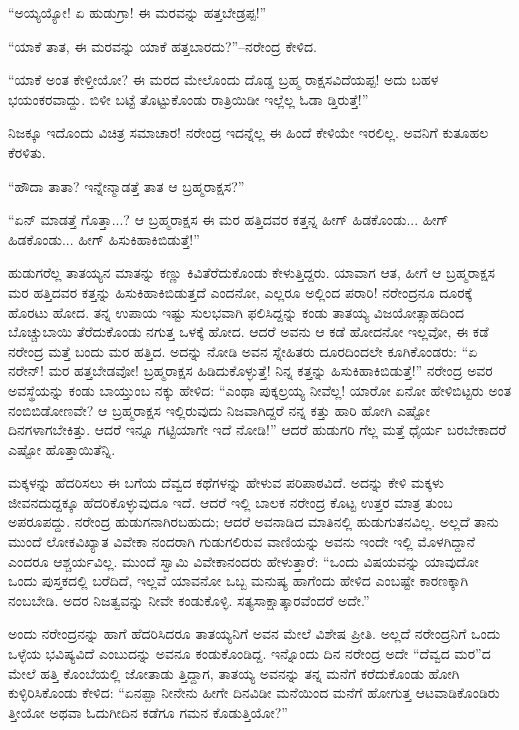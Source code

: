 “ಅಯ್ಯಯ್ಯೋ! ಏ ಹುಡುಗ್ರಾ! ಈ ಮರವನ್ನು ಹತ್ತಬೇಡ್ರಪ್ಪ!”

“ಯಾಕೆ ತಾತ, ಈ ಮರವನ್ನು ಯಾಕೆ ಹತ್ತಬಾರದು?”–ನರೇಂದ್ರ ಕೇಳಿದ.

“ಯಾಕೆ ಅಂತ ಕೇಳ್ತೀಯೋ? ಈ ಮರದ ಮೇಲೊಂದು ದೊಡ್ಡ ಬ್ರಹ್ಮ ರಾಕ್ಷಸವಿದೆಯಪ್ಪ! ಅದು ಬಹಳ ಭಯಂಕರವಾದ್ದು. ಬಿಳೀ ಬಟ್ಟೆ ತೊಟ್ಟುಕೊಂಡು ರಾತ್ರಿಯಿಡೀ ಇಲ್ಲೆಲ್ಲ ಓಡಾ ಡ್ತಿರುತ್ತೆ!”

ನಿಜಕ್ಕೂ ಇದೊಂದು ವಿಚಿತ್ರ ಸಮಾಚಾರ! ನರೇಂದ್ರ ಇದನ್ನೆಲ್ಲ ಈ ಹಿಂದೆ ಕೇಳಿಯೇ ಇರಲಿಲ್ಲ. ಅವನಿಗೆ ಕುತೂಹಲ ಕೆರಳಿತು. 

“ಹೌದಾ ತಾತಾ? ಇನ್ನೇನ್ಮಾಡತ್ತೆ ತಾತ ಆ ಬ್ರಹ್ಮರಾಕ್ಷಸ?”

“ಏನ್ ಮಾಡತ್ತೆ ಗೊತ್ತಾ...? ಆ ಬ್ರಹ್ಮರಾಕ್ಷಸ ಈ ಮರ ಹತ್ತಿದವರ ಕತ್ತನ್ನ ಹೀಗ್ ಹಿಡಕೊಂಡು... ಹೀಗ್ ಹಿಡಕೊಂಡು... ಹೀಗ್ ಹಿಸುಕಿಹಾಕಿಬಿಡುತ್ತೆ!”

ಹುಡುಗರೆಲ್ಲ ತಾತಯ್ಯನ ಮಾತನ್ನು ಕಣ್ಣು ಕಿವಿತೆರೆದುಕೊಂಡು ಕೇಳುತ್ತಿದ್ದರು. ಯಾವಾಗ ಆತ, ಹೀಗೆ ಆ ಬ್ರಹ್ಮರಾಕ್ಷಸ ಮರ ಹತ್ತಿದವರ ಕತ್ತನ್ನು ಹಿಸುಕಿಹಾಕಿಬಿಡುತ್ತದೆ ಎಂದನೋ, ಎಲ್ಲರೂ ಅಲ್ಲಿಂದ ಪರಾರಿ! ನರೇಂದ್ರನೂ ದೂರಕ್ಕೆ ಹೊರಟು ಹೋದ. ತನ್ನ ಉಪಾಯ ಇಷ್ಟು ಸುಲಭವಾಗಿ ಫಲಿಸಿದ್ದನ್ನು ಕಂಡು ತಾತಯ್ಯ ವಿಜಯೋತ್ಸಾಹದಿಂದ ಬೊಚ್ಚುಬಾಯಿ ತೆರೆದುಕೊಂಡು ನಗುತ್ತ ಒಳಕ್ಕೆ ಹೋದ. ಆದರೆ ಅವನು ಆ ಕಡೆ ಹೋದನೋ ಇಲ್ಲವೋ, ಈ ಕಡೆ ನರೇಂದ್ರ ಮತ್ತೆ ಬಂದು ಮರ ಹತ್ತಿದ. ಅದನ್ನು ನೋಡಿ ಅವನ ಸ್ನೇಹಿತರು ದೂರದಿಂದಲೇ ಕೂಗಿಕೊಂಡರು: “ಏ ನರೇನ್! ಮರ ಹತ್ತಬೇಡವೋ! ಬ್ರಹ್ಮರಾಕ್ಷಸ ಹಿಡಿದುಕೊಳ್ಳುತ್ತೆ! ನಿನ್ನ ಕತ್ತನ್ನು ಹಿಸುಕಿಹಾಕಿಬಿಡುತ್ತೆ!” ನರೇಂದ್ರ ಅವರ ಅವಸ್ಥೆಯನ್ನು ಕಂಡು ಬಾಯ್ತುಂಬ ನಕ್ಕು ಹೇಳಿದ: “ಎಂಥಾ ಪುಕ್ಕಲ್ರಯ್ಯ ನೀವೆಲ್ಲ! ಯಾರೋ ಏನೋ ಹೇಳಿಬಿಟ್ಟರು ಅಂತ ನಂಬಿಬಿಡೋಣವೇ? ಆ ಬ್ರಹ್ಮರಾಕ್ಷಸ ಇಲ್ಲಿರುವುದು ನಿಜವಾಗಿದ್ದರೆ ನನ್ನ ಕತ್ತು ಹಾರಿ ಹೋಗಿ ಎಷ್ಟೋ ದಿನಗಳಾಗಬೇಕಿತ್ತು. ಆದರೆ ಇನ್ನೂ ಗಟ್ಟಿಯಾಗೇ ಇದೆ ನೋಡಿ!” ಆದರೆ ಹುಡುಗರಿ ಗೆಲ್ಲ ಮತ್ತೆ ಧೈರ್ಯ ಬರಬೇಕಾದರೆ ಎಷ್ಟೋ ಹೊತ್ತಾಯಿತೆನ್ನಿ.

ಮಕ್ಕಳನ್ನು ಹೆದರಿಸಲು ಈ ಬಗೆಯ ದೆವ್ವದ ಕಥೆಗಳನ್ನು ಹೇಳುವ ಪರಿಪಾಠವಿದೆ. ಅದನ್ನು ಕೇಳಿ ಮಕ್ಕಳು ಜೀವನದುದ್ದಕ್ಕೂ ಹೆದರಿಕೊಳ್ಳುವುದೂ ಇದೆ. ಆದರೆ ಇಲ್ಲಿ ಬಾಲಕ ನರೇಂದ್ರ ಕೊಟ್ಟ ಉತ್ತರ ಮಾತ್ರ ತುಂಬ ಅಪರೂಪದ್ದು. ನರೇಂದ್ರ ಹುಡುಗನಾಗಿರಬಹುದು; ಆದರೆ ಅವನಾಡಿದ ಮಾತಿನಲ್ಲಿ ಹುಡುಗುತನವಿಲ್ಲ. ಅಲ್ಲದೆ ತಾನು ಮುಂದೆ ಲೋಕವಿಖ್ಯಾತ ವಿವೇಕಾ ನಂದರಾಗಿ ಗುಡುಗಲಿರುವ ವಾಣಿಯನ್ನು ಅವನು ಇಂದೇ ಇಲ್ಲಿ ಮೊಳಗಿದ್ದಾನೆ ಎಂದರೂ ಆಶ್ಚರ್ಯವಿಲ್ಲ. ಮುಂದೆ ಸ್ವಾಮಿ ವಿವೇಕಾನಂದರು ಹೇಳುತ್ತಾರೆ: “ಒಂದು ವಿಷಯವನ್ನು ಯಾವುದೋ ಒಂದು ಪುಸ್ತಕದಲ್ಲಿ ಬರೆದಿದೆ, ಇಲ್ಲವೆ ಯಾವನೋ ಒಬ್ಬ ಮನುಷ್ಯ ಹಾಗೆಂದು ಹೇಳಿದ ಎಂಬಷ್ಟೇ ಕಾರಣಕ್ಕಾಗಿ ನಂಬಬೇಡಿ. ಅದರ ನಿಜತ್ವವನ್ನು ನೀವೇ ಕಂಡುಕೊಳ್ಳಿ. ಸತ್ಯಸಾಕ್ಷಾತ್ಕಾರವೆಂದರೆ ಅದೇ.”

ಅಂದು ನರೇಂದ್ರನನ್ನು ಹಾಗೆ ಹೆದರಿಸಿದರೂ ತಾತಯ್ಯನಿಗೆ ಅವನ ಮೇಲೆ ವಿಶೇಷ ಪ್ರೀತಿ. ಅಲ್ಲದೆ ನರೇಂದ್ರನಿಗೆ ಒಂದು ಒಳ್ಳೆಯ ಭವಿಷ್ಯವಿದೆ ಎಂಬುದನ್ನು ಅವನೂ ಕಂಡುಕೊಂಡಿದ್ದ. ಇನ್ನೊಂದು ದಿನ ನರೇಂದ್ರ ಅದೇ “ದೆವ್ವದ ಮರ”ದ ಮೇಲೆ ಹತ್ತಿ ಕೊಂಬೆಯಲ್ಲಿ ಜೋತಾಡು ತ್ತಿದ್ದಾಗ, ತಾತಯ್ಯ ಅವನನ್ನು ತನ್ನ ಮನೆಗೆ ಕರೆದುಕೊಂಡು ಹೋಗಿ ಕುಳ್ಳಿರಿಸಿಕೊಂಡು ಕೇಳಿದ: “ಏನಪ್ಪಾ ನೀನೇನು ಹೀಗೇ ದಿನವಿಡೀ ಮನೆಯಿಂದ ಮನೆಗೆ ಹೋಗುತ್ತ ಆಟವಾಡಿಕೊಂಡಿರು ತ್ತೀಯೋ ಅಥವಾ ಓದುಗೀದಿನ ಕಡೆಗೂ ಗಮನ ಕೊಡುತ್ತಿಯೋ?”

